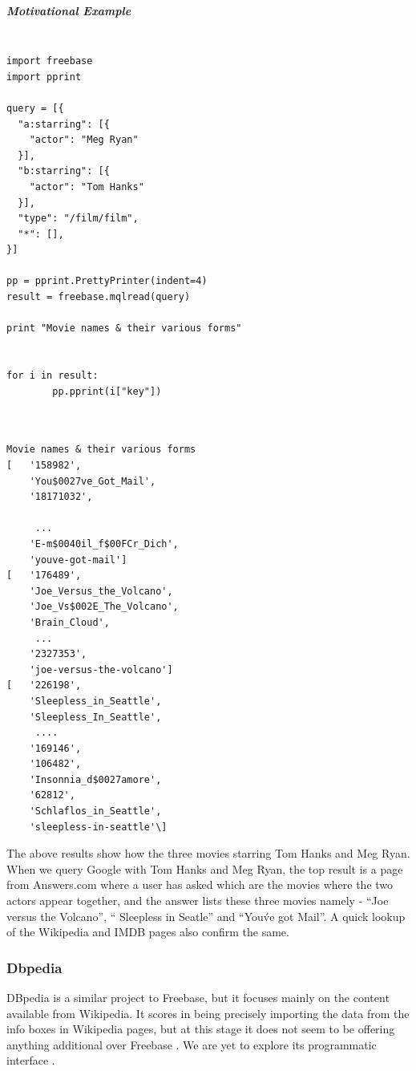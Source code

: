 \documentclass[11pt]{article}
\begin{document}
\subparagraph{Motivational Example}

\begin{lstlisting}[label=some-code,caption=Minimal code to Freebase]

import freebase
import pprint

query = [{
  "a:starring": [{
    "actor": "Meg Ryan"                                                       
  }],
  "b:starring": [{                                                            
    "actor": "Tom Hanks"
  }],
  "type": "/film/film",
  "*": [],
}]  
    
pp = pprint.PrettyPrinter(indent=4)
result = freebase.mqlread(query)
    
print "Movie names & their various forms"
    
    
for i in result:                                                              
        pp.pprint(i["key"])                                                   
                
\end{lstlisting}
\begin{lstlisting}[label=output,caption=Cleaned Output]

Movie names & their various forms
[   '158982',
    'You$0027ve_Got_Mail',
    '18171032',

     ...
    'E-m$0040il_f$00FCr_Dich',
    'youve-got-mail']
[   '176489',
    'Joe_Versus_the_Volcano',
    'Joe_Vs$002E_The_Volcano',
    'Brain_Cloud',
     ...
    '2327353',
    'joe-versus-the-volcano']
[   '226198',
    'Sleepless_in_Seattle',
    'Sleepless_In_Seattle',
     ....
    '169146',
    '106482',
    'Insonnia_d$0027amore',
    '62812',
    'Schlaflos_in_Seattle',
    'sleepless-in-seattle'\]

\end{lstlisting}

The above results show how the three movies starring Tom Hanks and Meg Ryan.
When we query Google with Tom Hanks and Meg Ryan, the top result is a page from
Answers.com where a user has asked which are the movies where the two actors
appear together, and the answer lists these three movies namely - ``Joe versus
the Volcano'', `` Sleepless in Seatle'' and ``You\'ve got Mail''. A quick lookup
of the Wikipedia and IMDB pages also confirm the same. 

\subsubsection{Dbpedia}
DBpedia is a similar project to Freebase, but it focuses mainly on the content
available from Wikipedia. It scores in being precisely importing the data from
the info boxes in Wikipedia pages, but at this stage it does not seem to be
offering anything additional over Freebase \cite{freebasedbpedia}. We are yet to
explore its programmatic interface \cite{dbpediaapi}.
\end{document}
